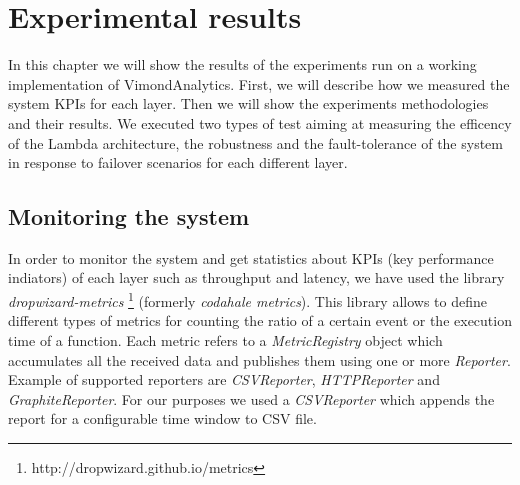 \chapter{Experimental results}
\label{chapt:chapter5}
In this chapter we will show the results of the experiments run on a working implementation of VimondAnalytics. First, we will describe how we measured the system KPIs for each layer. Then we will show the experiments methodologies and their results. We executed two types of test aiming at measuring the efficency of the Lambda architecture, the robustness and the fault-tolerance of the system in response to failover scenarios for each different layer.
\section{Monitoring the system}
\label{metrics}
In order to monitor the system and get statistics about KPIs (key performance indiators) of each layer such as throughput and latency, we have used the library \textit{dropwizard-metrics} \footnote{http://dropwizard.github.io/metrics} (formerly \textit{codahale metrics}). This library allows to define different types of metrics for counting the ratio of a certain event or the execution time of a function. Each metric refers to a \textit{MetricRegistry} object which accumulates all the received data and publishes them using one or more \textit{Reporter}. Example of supported reporters are \textit{CSVReporter}, \textit{HTTPReporter} and \textit{GraphiteReporter}. For our purposes we used a \textit{CSVReporter} which appends the report for a configurable time window to CSV file. 
